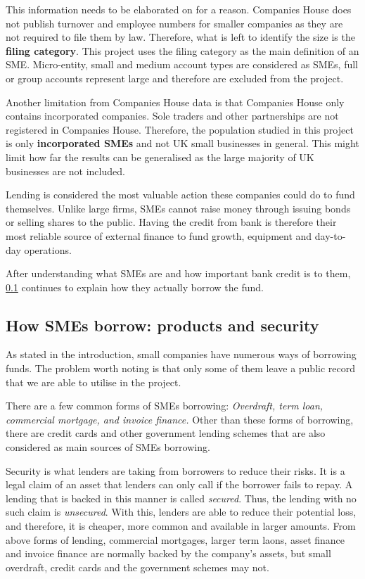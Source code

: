 \documentclass[ %
                    author={Natchalin Iwsakul \\[0.4em] Inkaphol Siriwongwattana \\[0.4em] Tanaphan Kummaraphat \\[0.6em] Patorn Srisupap},,
                supervisor={Fernando Moreno-Pino},
                    degree={MSc},
                     title={Propensity Modelling for SME Commercial Lending Using Open Public Data
},
                  subtitle={Companies House and GDELT as predictors of first-time borrowing},
                      type={},
                      year={2026}]{dissertation}
\begin{document}
This information needs to be elaborated on for a reason. Companies House does not publish turnover and employee numbers for smaller companies as they are not required to file them by law. Therefore, what is left to identify the size is the \textbf{filing category}. This project uses the filing category as the main definition of an SME. Micro-entity, small and medium account types are considered as SMEs, full or group accounts represent large and therefore are excluded from the project.

Another limitation from Companies House data is that Companies House only contains incorporated companies. Sole traders and other partnerships are not registered in Companies House. Therefore, the population studied in this project is only \textbf{incorporated SMEs} and not UK small businesses in general. This might limit how far the results can be generalised as the large majority of UK businesses are not included.

Lending is considered the most valuable action these companies could do to fund themselves. Unlike large firms, SMEs cannot raise money through issuing bonds or selling shares to the public. Having the credit from bank is therefore their most reliable source of external finance to fund growth, equipment and day-to-day operations.

After understanding what SMEs are and how important bank credit is to them, \ref{sec:borrowing} continues to explain how they actually borrow the fund.


\subsection{How SMEs borrow: products and security}
\label{sec:borrowing}

As stated in the introduction, small companies have numerous ways of borrowing funds. The problem worth noting is that only some of them leave a public record that we are able to utilise in the project.

There are a few common forms of SMEs borrowing: \textit{Overdraft, term loan, commercial mortgage, and invoice finance.} Other than these forms of borrowing, there are credit cards and other government lending schemes that are also considered as main sources of SMEs borrowing.

Security is what lenders are taking from borrowers to reduce their risks. It is a legal claim of an asset that lenders can only call if the borrower fails to repay. A lending that is backed in this manner is called \textit{secured}. Thus, the lending with no such claim is \textit{unsecured}. With this, lenders are able to reduce their potential loss, and therefore, it is cheaper, more common and available in larger amounts. From above forms of lending, commercial mortgages, larger term laons, asset finance and invoice finance are normally backed by the company's assets, but small overdraft, credit cards and the government schemes may not.
\end{document}
